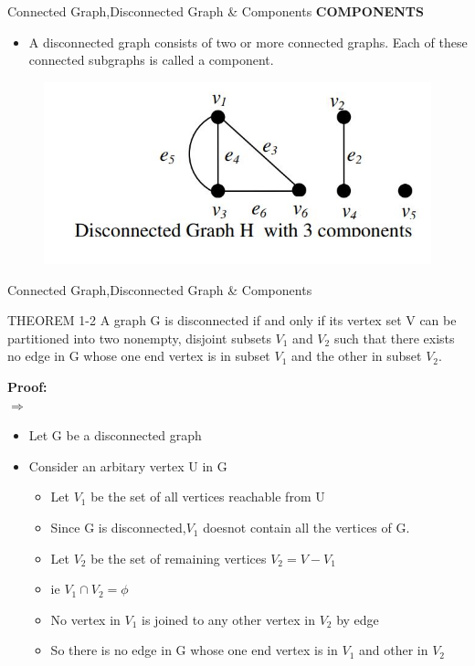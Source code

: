 \documentclass{beamer}
\begin{document}
\begin{frame}{Connected Graph,Disconnected Graph \& Components}
	\textbf{COMPONENTS }
	\begin{itemize}
		\item A disconnected graph consists of two or more connected graphs. Each of these connected 
		subgraphs is called a component.
	\end{itemize}
	\begin{figure}
		\includegraphics[scale=.6]{img/m37}
	\end{figure}
\end{frame}
\begin{frame}{Connected Graph,Disconnected Graph \& Components}
\begin{block}{THEOREM 1-2}
	A graph G is disconnected if and only if its vertex set V can be partitioned into two 
	nonempty, disjoint subsets $V_1$ and $V_2$ such that there exists no edge in G whose one end 
	vertex is in subset $V_1$ and the other in subset $V_2$.
\end{block}
\textbf{Proof:}\\
$\Rightarrow$
\begin{itemize}
	\item Let  G be a disconnected graph
	\item Consider an arbitary vertex U in G 
	\begin{itemize}
		\item Let $V_1$ be the set of all vertices reachable from U
		\item Since G is disconnected,$V_1$ doesnot contain all the vertices of G.
		\item Let $V_2$ be the set of remaining vertices $V_2=V-V_1$
		\item ie $V_1 \cap V_2=\phi$
		\item No vertex in $V_1$ is joined to any other vertex in $V_2$ by edge
		\item So there is no edge in G whose one end vertex is in $V_1$ and other in $V_2$
	\end{itemize}
\end{itemize}

\end{frame}
\end{document}
